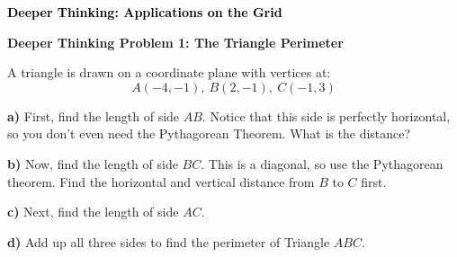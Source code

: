 \documentclass[12pt, letterpaper, fleqn]{article}
\begin{document}
\newpage

\begin{tcolorbox}[colback=customteal!20]
\large\textcolor{black}{\textbf{Deeper Thinking: Applications on the Grid}}
\end{tcolorbox}

\vspace{3mm}

\begin{tcolorbox}[colback=white!15, colframe=black, boxrule=1.5pt, arc=4mm, left=6mm, right=6mm, top=5mm, bottom=5mm]

\textbf{Deeper Thinking Problem 1: The Triangle Perimeter}

\medskip

\noindent
A triangle is drawn on a coordinate plane with vertices at:
\[ A(-4, -1), \ B(2, -1), \ C(-1, 3) \]

\vspace{5mm}

\noindent
\textbf{a)} First, find the length of side $AB$. Notice that this side is perfectly horizontal, so you don't even need the Pythagorean Theorem. What is the distance?

\vspace{2cm}

\noindent
\textbf{b)} Now, find the length of side $BC$. This is a diagonal, so use the Pythagorean theorem. Find the horizontal and vertical distance from $B$ to $C$ first. 

\vspace{3cm}

\noindent
\textbf{c)} Next, find the length of side $AC$. 

\vspace{3cm}

\noindent
\textbf{d)} Add up all three sides to find the perimeter of Triangle $ABC$. 

\vspace{2cm}

\end{tcolorbox}
\end{document}
